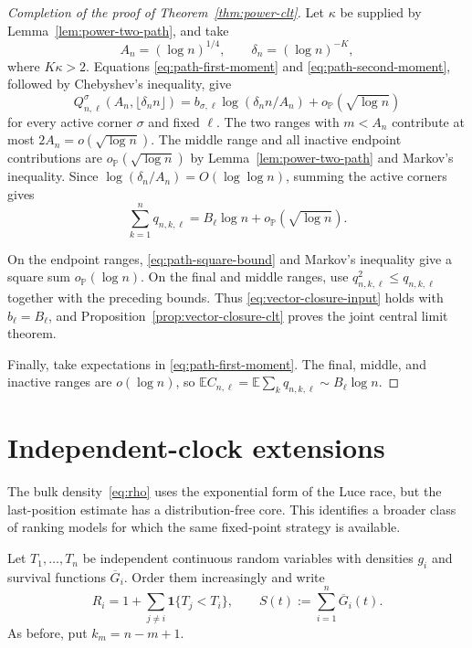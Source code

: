 \documentclass[11pt]{article}
\theoremstyle{remark}
\theoremstyle{plain}
\newcommand{\E}{\mathbb E}
\newcommand{\Pp}{\mathbb P}
\newcommand{\one}{\mathbf 1}
\begin{document}
\begin{proof}[Completion of the proof of Theorem~\ref{thm:power-clt}]
Let $\kappa$ be supplied by Lemma~\ref{lem:power-two-path}, and take
\[
 A_n=(\log n)^{1/4},\qquad
 \delta_n=(\log n)^{-K},
\]
where $K\kappa>2$.  Equations \eqref{eq:path-first-moment} and
\eqref{eq:path-second-moment}, followed by Chebyshev's inequality, give
\begin{equation}\label{eq:cycle-compensator-corners}
 Q^\sigma_{n,\ell}(A_n,\lfloor\delta_n n\rfloor)
 =b_{\sigma,\ell}\log(\delta_n n/A_n)
 +o_{\Pp}(\sqrt{\log n})
\end{equation}
for every active corner $\sigma$ and fixed $\ell$.  The two ranges with
$m<A_n$ contribute at most $2A_n=o(\sqrt{\log n})$.  The middle range and
all inactive endpoint contributions are $o_{\Pp}(\sqrt{\log n})$ by
Lemma~\ref{lem:power-two-path} and Markov's inequality.  Since
$\log(\delta_n/A_n)=O(\log\log n)$, summing the active corners gives
\[
 \sum_{k=1}^nq_{n,k,\ell}
 =B_\ell\log n+o_{\Pp}(\sqrt{\log n}).
\]

On the endpoint ranges, \eqref{eq:path-square-bound} and Markov's inequality
give a square sum $o_{\Pp}(\log n)$.  On the final and middle ranges,
use $q_{n,k,\ell}^2\le q_{n,k,\ell}$ together with the preceding bounds.
Thus \eqref{eq:vector-closure-input} holds with
$b_\ell=B_\ell$, and Proposition~\ref{prop:vector-closure-clt}
proves the joint central limit theorem.

Finally, take expectations in \eqref{eq:path-first-moment}.  The final,
middle, and inactive ranges are $o(\log n)$, so
$\E C_{n,\ell}=\E\sum_kq_{n,k,\ell}\sim B_\ell\log n$.
\end{proof}

\section{Independent-clock extensions}\label{sec:clock-extensions}

The bulk density~\eqref{eq:rho} uses the exponential form of the Luce race,
but the last-position estimate has a distribution-free core.  This identifies
a broader class of ranking models for which the same fixed-point strategy is
available.

Let $T_1,\ldots,T_n$ be independent continuous random variables with
densities $g_i$ and survival functions $\overline G_i$.  Order them
increasingly and write
\[
 R_i=1+\sum_{j\ne i}\one\{T_j<T_i\},\qquad
 S(t):=\sum_{i=1}^n\overline G_i(t).
\]
As before, put $k_m=n-m+1$.
\end{document}
